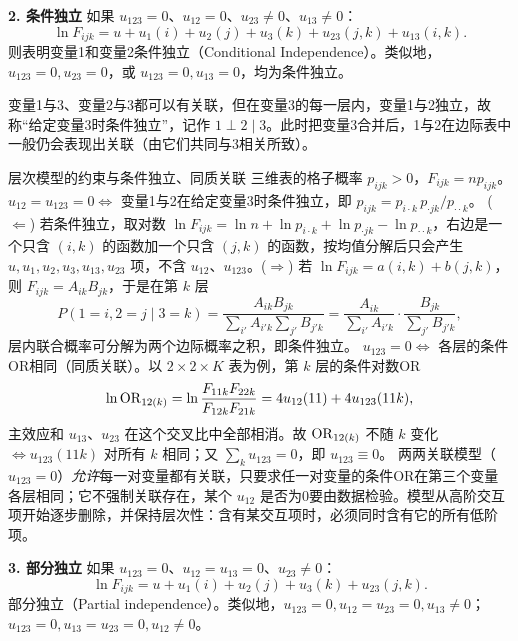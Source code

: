 \textbf{2. 条件独立} 如果 $u_{123}=0$、$u_{12}=0$、$u_{23}\ne0$、$u_{13}\ne0$：
\[
\ln F_{ijk}=u+u_1(i)+u_2(j)+u_3(k)+u_{23}(j,k)+u_{13}(i,k).
\]
则表明变量1和变量2条件独立（Conditional Independence）。类似地，$u_{123}=0,u_{23}=0$，或 $u_{123}=0,u_{13}=0$，均为条件独立。
\begin{annotation}变量1与3、变量2与3都可以有关联，但在变量3的每一层内，变量1与2独立，故称“给定变量3时条件独立”，记作 $1\perp2\mid3$。此时把变量3合并后，1与2在边际表中一般仍会表现出关联（由它们共同与3相关所致）。\end{annotation}
\begin{derivation}{层次模型的约束与条件独立、同质关联}
三维表的格子概率 $p_{ijk}>0$，$F_{ijk}=np_{ijk}$。
$u_{12}=u_{123}=0\iff$ 变量1与2在给定变量3时条件独立，即 $p_{ijk}=p_{i\cdot k}\,p_{\cdot jk}/p_{\cdot\cdot k}$。
($\Leftarrow$) 若条件独立，取对数 $\ln F_{ijk}=\ln n+\ln p_{i\cdot k}+\ln p_{\cdot jk}-\ln p_{\cdot\cdot k}$，右边是一个只含 $(i,k)$ 的函数加一个只含 $(j,k)$ 的函数，按均值分解后只会产生 $u,u_1,u_2,u_3,u_{13},u_{23}$ 项，不含 $u_{12}$、$u_{123}$。($\Rightarrow$) 若 $\ln F_{ijk}=a(i,k)+b(j,k)$，则 $F_{ijk}=A_{ik}B_{jk}$，于是在第 $k$ 层
\[
P(1=i,2=j\mid3=k)=\frac{A_{ik}B_{jk}}{\sum_{i'}A_{i'k}\sum_{j'}B_{j'k}}
=\frac{A_{ik}}{\sum_{i'}A_{i'k}}\cdot\frac{B_{jk}}{\sum_{j'}B_{j'k}},
\]
层内联合概率可分解为两个边际概率之积，即条件独立。
$u_{123}=0\iff$ 各层的条件OR相同（同质关联）。以 $2\times2\times K$ 表为例，第 $k$ 层的条件对数OR
\[
\ln\operatorname{OR}_{12(k)}=\ln\frac{F_{11k}F_{22k}}{F_{12k}F_{21k}}=4u_{12}(11)+4u_{123}(11k),
\]
主效应和 $u_{13}$、$u_{23}$ 在这个交叉比中全部相消。故 $\operatorname{OR}_{12(k)}$ 不随 $k$ 变化 $\iff u_{123}(11k)$ 对所有 $k$ 相同；又 $\sum_ku_{123}=0$，即 $u_{123}\equiv0$。
两两关联模型（$u_{123}=0$）\emph{允许}每一对变量都有关联，只要求任一对变量的条件OR在第三个变量各层相同；它不强制关联存在，某个 $u_{12}$ 是否为0要由数据检验。模型从高阶交互项开始逐步删除，并保持层次性：含有某交互项时，必须同时含有它的所有低阶项。
\end{derivation}

\textbf{3. 部分独立} 如果 $u_{123}=0$、$u_{12}=u_{13}=0$、$u_{23}\ne0$：
\[
\ln F_{ijk}=u+u_1(i)+u_2(j)+u_3(k)+u_{23}(j,k).
\]
部分独立（Partial independence）。类似地，$u_{123}=0,u_{12}=u_{23}=0,u_{13}\ne0$；$u_{123}=0,u_{13}=u_{23}=0,u_{12}\ne0$。

